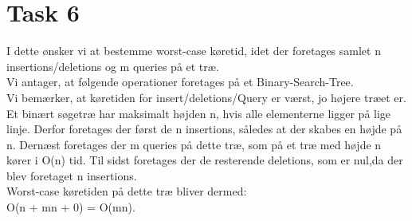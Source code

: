 \section{Task 6}

I dette ønsker vi at bestemme worst-case køretid, idet der foretages samlet n insertions/deletions og m queries på et træ.\\

Vi antager, at følgende operationer foretages på et Binary-Search-Tree.\\

Vi bemærker, at køretiden for insert/deletions/Query er værst, jo højere træet er. Et binært søgetræ har maksimalt højden n, hvis alle elementerne ligger på lige linje. Derfor foretages der først de n insertions, således at der skabes en højde på n. Dernæst foretages der m queries på dette træ, som på et træ med højde n kører i O(n) tid. Til sidst foretages der de resterende deletions, som er nul,da der blev foretaget n insertions.\\

Worst-case køretiden på dette træ bliver dermed:\\
O(n + mn + 0) = O(mn).

